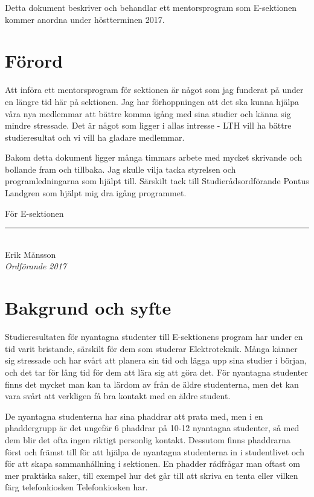 \documentclass[10pt]{article}
\def\year{2017}
\def\doctitle{E-sektionens mentorsprogram \year}
\begin{document}
    \heading{\doctitle}

    Detta dokument beskriver och behandlar ett mentorsprogram som E-sektionen kommer anordna under höstterminen \year.

    \tableofcontents

    \newpage

    \section{Förord}
    Att införa ett mentorsprogram för sektionen är något som jag funderat på under en längre tid här på sektionen.
    Jag har förhoppningen att det ska kunna hjälpa våra nya medlemmar att bättre komma igång med sina studier och känna sig mindre stressade.
    Det är något som ligger i allas intresse - LTH vill ha bättre studieresultat och vi vill ha gladare medlemmar.

    Bakom detta dokument ligger många timmars arbete med mycket skrivande och bollande fram och tillbaka.
    Jag skulle vilja tacka styrelsen och programledningarna som hjälpt till.
    Särskilt tack till Studierådsordförande Pontus Landgren som hjälpt mig dra igång programmet.

    \vspace*{1\baselineskip}
    För E-sektionen
    \vspace*{1.5cm}
    \par
    \parbox{5.8cm}{
        \rule{5.0cm}{0.4pt}\\
        Erik Månsson\\
        \emph{Ordförande 2017}
    }

    \newpage

    \section{Bakgrund och syfte}
    Studieresultaten för nyantagna studenter till E-sektionens program har under en tid varit bristande, särskilt för dem som studerar Elektroteknik.
    Många känner sig stressade och har svårt att planera sin tid och lägga upp sina studier i början, och det tar för lång tid för dem att lära sig att göra det.
    För nyantagna studenter finns det mycket man kan ta lärdom av från de äldre studenterna, men det kan vara svårt att verkligen få bra kontakt med en äldre student.

    De nyantagna studenterna har sina phaddrar att prata med, men i en phaddergrupp är det ungefär 6 phaddrar på 10-12 nyantagna studenter, så med dem blir det ofta ingen riktigt personlig kontakt.
    Dessutom finns phaddrarna först och främst till för att hjälpa de nyantagna studenterna in i studentlivet och för att skapa sammanhållning i sektionen.
    En phadder rådfrågar man oftast om mer praktiska saker, till exempel hur det går till att skriva en tenta eller vilken färg telefonkiosken Telefonkiosken har.
\end{document}
